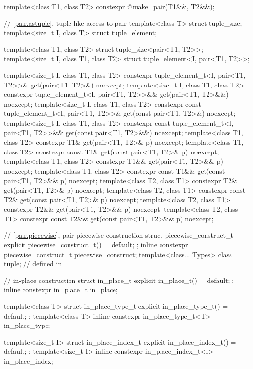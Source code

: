\begin{codeblock}
{  template<class T1, class T2>
    constexpr @\seebelow@ make_pair(T1&&, T2&&);

  // \ref{pair.astuple}, tuple-like access to pair
  template<class T> struct tuple_size;
  template<size_t I, class T> struct tuple_element;

  template<class T1, class T2> struct tuple_size<pair<T1, T2>>;
  template<size_t I, class T1, class T2> struct tuple_element<I, pair<T1, T2>>;

  template<size_t I, class T1, class T2>
    constexpr tuple_element_t<I, pair<T1, T2>>& get(pair<T1, T2>&) noexcept;
  template<size_t I, class T1, class T2>
    constexpr tuple_element_t<I, pair<T1, T2>>&& get(pair<T1, T2>&&) noexcept;
  template<size_t I, class T1, class T2>
    constexpr const tuple_element_t<I, pair<T1, T2>>& get(const pair<T1, T2>&) noexcept;
  template<size_t I, class T1, class T2>
    constexpr const tuple_element_t<I, pair<T1, T2>>&& get(const pair<T1, T2>&&) noexcept;
  template<class T1, class T2>
    constexpr T1& get(pair<T1, T2>& p) noexcept;
  template<class T1, class T2>
    constexpr const T1& get(const pair<T1, T2>& p) noexcept;
  template<class T1, class T2>
    constexpr T1&& get(pair<T1, T2>&& p) noexcept;
  template<class T1, class T2>
    constexpr const T1&& get(const pair<T1, T2>&& p) noexcept;
  template<class T2, class T1>
    constexpr T2& get(pair<T1, T2>& p) noexcept;
  template<class T2, class T1>
    constexpr const T2& get(const pair<T1, T2>& p) noexcept;
  template<class T2, class T1>
    constexpr T2&& get(pair<T1, T2>&& p) noexcept;
  template<class T2, class T1>
    constexpr const T2&& get(const pair<T1, T2>&& p) noexcept;

  // \ref{pair.piecewise}, pair piecewise construction
  struct piecewise_construct_t {
    explicit piecewise_construct_t() = default;
  };
  inline constexpr piecewise_construct_t piecewise_construct{};
  template<class... Types> class tuple;         // defined in 

  // in-place construction%
%
%
%
%
%
  struct in_place_t {
    explicit in_place_t() = default;
  };
  inline constexpr in_place_t in_place{};

  template<class T>
    struct in_place_type_t {
      explicit in_place_type_t() = default;
    };
  template<class T> inline constexpr in_place_type_t<T> in_place_type{};

  template<size_t I>
    struct in_place_index_t {
      explicit in_place_index_t() = default;
    };
  template<size_t I> inline constexpr in_place_index_t<I> in_place_index{};
}
\end{codeblock}

